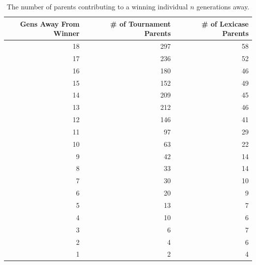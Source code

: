 \begin{table}[t]
	\caption{The number of parents contributing to a winning individual $n$ generations away.}
	\label{table:branching}
	\begin{center}
	\begin{tabular}{rrr}
		Gens Away From Winner & $\quad$ \# of Tournament Parents & $\quad$ \# of Lexicase Parents  \\
		\hline\noalign{\smallskip}
		18 & 297 & 58\\
		17 & 236 & 52\\
		16 & 180 & 46\\
		15 & 152 & 49\\
		14 & 209 & 45\\
		13 & 212 & 46\\
		12 & 146 & 41\\
		11 & 97 & 29\\
		10 & 63 & 22\\
		9 & 42  & 14\\
		8 & 33  & 14\\
		7 & 30  & 10\\
		6 & 20  & 9\\
		5 & 13  & 7\\
		4 & 10  & 6\\
		3 & 6  & 7\\		
		2 & 4  & 6\\
		1 & 2  & 4\\
	\end{tabular}
	\end{center}
\end{table}



